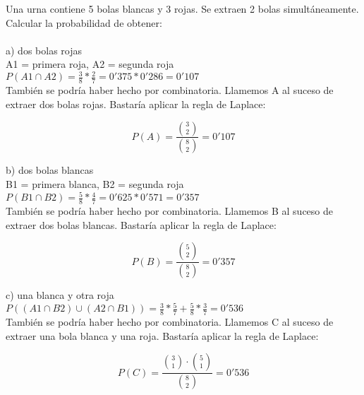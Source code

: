 
\problem
Una urna contiene 5 bolas blancas y 3 rojas. Se extraen 2 bolas simultáneamente. Calcular la probabilidad de obtener: \\ \\
\subproblem
a) dos bolas rojas \\
A1 = primera roja, A2 = segunda roja \\
$P(A1 \cap A2) = \frac{3}{8} * \frac{2}{7} = 0'375*0'286 = 0'107$ \\

También se podría haber hecho por combinatoria. Llamemos A al suceso de extraer dos bolas rojas. Bastaría aplicar la regla de Laplace:

$$P(A) = \frac{{3 \choose 2}}{{8 \choose 2}} = 0'107$$

\subproblem
b) dos bolas blancas \\ 
B1 = primera blanca, B2 = segunda roja \\
$P(B1 \cap B2) =  \frac{5}{8} * \frac{4}{7} = 0'625 * 0'571 = 0'357$ \\

También se podría haber hecho por combinatoria. Llamemos B al suceso de extraer dos bolas blancas. Bastaría aplicar la regla de Laplace:

$$P(B) = \frac{{5 \choose 2}}{{8 \choose 2}} = 0'357$$

\subproblem
c) una blanca y otra roja \\
$P((A1 \cap B2)\cup (A2 \cap B1)) = \frac{3}{8}*\frac{5}{7} + \frac{5}{8}*\frac{3}{7} = 0'536$ \\

También se podría haber hecho por combinatoria. Llamemos C al suceso de extraer una bola blanca y una roja. Bastaría aplicar la regla de Laplace:

$$P(C) = \frac{{3 \choose 1}·{5 \choose 1}}{{8 \choose 2}} = 0'536$$